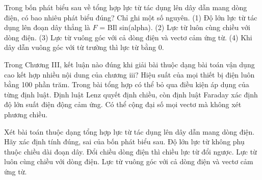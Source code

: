 \begin{ex}
Trong bốn phát biểu sau về tổng hợp lực từ tác dụng lên dây dẫn mang dòng điện, có bao nhiêu phát biểu đúng? Chỉ ghi một số nguyên. (1) Độ lớn lực từ tác dụng lên đoạn dây thẳng là $F$ = BIl sin(alpha). (2) Lực từ luôn cùng chiều với dòng điện. (3) Lực từ vuông góc với cả dòng điện và vectơ cảm ứng từ. (4) Khi dây dẫn vuông góc với từ trường thì lực từ bằng 0.
\end{ex}

\begin{ex}
Trong Chương III, kết luận nào đúng khi giải bài thuộc dạng bài toán vận dụng cao kết hợp nhiều nội dung của chương iii?
\choice
{Hiệu suất của mọi thiết bị điện luôn bằng 100 phần trăm.}
{Trong bài tổng hợp có thể bỏ qua điều kiện áp dụng của từng định luật.}
{\True Định luật Lenz quyết định chiều, còn định luật Faraday xác định độ lớn suất điện động cảm ứng.}
{Có thể cộng đại số mọi vectơ mà không xét phương chiều.}
\end{ex}

\begin{ex}
Xét bài toán thuộc dạng tổng hợp lực từ tác dụng lên dây dẫn mang dòng điện. Hãy xác định tính đúng, sai của bốn phát biểu sau.
\choiceTF
{Độ lớn lực từ không phụ thuộc chiều dài đoạn dây.}
{\True Đổi chiều dòng điện thì chiều lực từ đổi ngược.}
{Lực từ luôn cùng chiều với dòng điện.}
{\True Lực từ vuông góc với cả dòng điện và vectơ cảm ứng từ.}
\end{ex}

